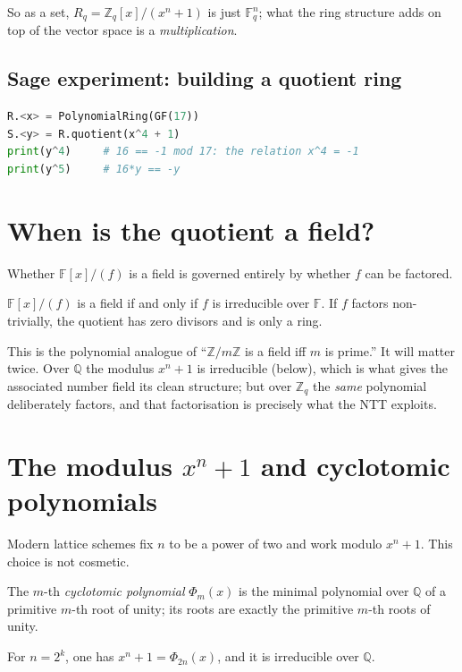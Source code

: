 So as a set, $R_q=\mathbb{Z}_q[x]/(x^n+1)$ is just $\mathbb{F}_q^n$; what the ring structure adds on top of the vector space is a \emph{multiplication}.

\subsection{Sage experiment: building a quotient ring}

\begin{lstlisting}[language=Python]
R.<x> = PolynomialRing(GF(17))
S.<y> = R.quotient(x^4 + 1)
print(y^4)     # 16 == -1 mod 17: the relation x^4 = -1
print(y^5)     # 16*y == -y
\end{lstlisting}

\section{When is the quotient a field?}
Whether $\mathbb{F}[x]/(f)$ is a field is governed entirely by whether $f$ can be factored.

\begin{theorem}
$\mathbb{F}[x]/(f)$ is a field if and only if $f$ is irreducible over $\mathbb{F}$. If $f$ factors non-trivially, the quotient has zero divisors and is only a ring.
\end{theorem}

This is the polynomial analogue of ``$\mathbb{Z}/m\mathbb{Z}$ is a field iff $m$ is prime.'' It will matter twice. Over $\mathbb{Q}$ the modulus $x^n+1$ is irreducible (below), which is what gives the associated number field its clean structure; but over $\mathbb{Z}_q$ the \emph{same} polynomial deliberately factors, and that factorisation is precisely what the NTT exploits.

\section{The modulus $x^n+1$ and cyclotomic polynomials}
Modern lattice schemes fix $n$ to be a power of two and work modulo $x^n+1$. This choice is not cosmetic.

\begin{definition}
The $m$-th \emph{cyclotomic polynomial} $\Phi_m(x)$ is the minimal polynomial over $\mathbb{Q}$ of a primitive $m$-th root of unity; its roots are exactly the primitive $m$-th roots of unity.
\end{definition}

\begin{proposition}
For $n=2^k$, one has $x^n+1 = \Phi_{2n}(x)$, and it is irreducible over $\mathbb{Q}$.
\end{proposition}

